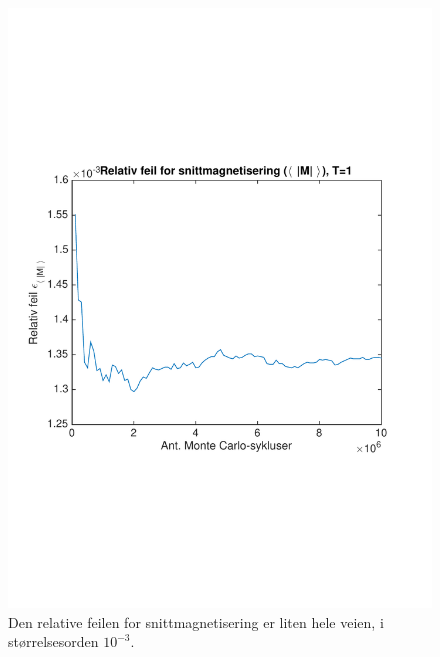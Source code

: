 \documentclass[norsk, 10pt]{article}
\begin{document}
\begin{figure}[H]
\centering
\includegraphics[scale = 0.6, trim = 1cm 8cm 1cm 8cm]{b_rel_err_mag_L2_T1.pdf}
\caption{Den relative feilen for snittmagnetisering er liten hele veien, i størrelsesorden $10^{-3}$.}
\label{fig:errmagT1L2}
\end{figure}
\end{document}
